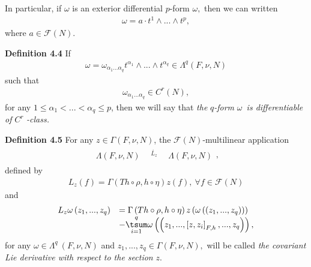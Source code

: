 \documentclass[11pt]{article}
\begin{document}
In particular, if $\omega $ is an exterior differential $p$-form $\omega ,$
then we can written
\begin{equation*}
\begin{array}{c}
\omega =a\cdot t^{1}\wedge ...\wedge t^{p},%
\end{array}%
\end{equation*}%
where $a\in \mathcal{F}\left( N\right) .$

\textbf{Definition 4.4 }If
\begin{equation*}
\begin{array}{c}
\omega =\omega _{\alpha _{1}...\alpha _{q}}t^{\alpha _{1}}\wedge ...\wedge
t^{\alpha _{q}}\in \Lambda ^{q}\left( F,\nu ,N\right)%
\end{array}%
\end{equation*}%
such that
\begin{equation*}
\begin{array}{c}
\omega _{\alpha _{1}...\alpha _{q}}\in C^{r}\left( N\right) ,%
\end{array}%
\end{equation*}%
for any $1\leq \alpha _{1}<...<\alpha _{q}\leq p$, then we will say that
\emph{the }$q$\emph{-form }$\omega $\emph{\ is differentiable of }$C^{r}$%
\emph{-class.}

\textbf{Definition 4.5 }For any $z\in \Gamma \left( F,\nu ,N\right) $, the $%
\mathcal{F}\left( N\right) $-multilinear application
\begin{equation*}
\begin{array}{c}
\begin{array}{rcl}
\Lambda \left( F,\nu ,N\right) & ^{\underrightarrow{~\ \ L_{z}~\ \ }} &
\Lambda \left( F,\nu ,N\right)%
\end{array}%
,%
\end{array}%
\end{equation*}%
defined by%
\begin{equation*}
\begin{array}{c}
L_{z}\left( f\right) =\Gamma \left( Th\circ \rho ,h\circ \eta \right)
z\left( f\right) ,~\forall f\in \mathcal{F}\left( N\right)%
\end{array}%
\end{equation*}%
and
\begin{equation*}
\begin{array}{cl}
L_{z}\omega \left( z_{1},...,z_{q}\right) & =\Gamma \left( Th\circ \rho
,h\circ \eta \right) z\left( \omega \left( \left( z_{1},...,z_{q}\right)
\right) \right) \\
& -\overset{q}{\underset{i=1}{\tsum }}\omega \left( \left( z_{1},...,\left[
z,z_{i}\right] _{F,h},...,z_{q}\right) \right) ,%
\end{array}%
\end{equation*}%
for any $\omega \in \Lambda ^{q}\mathbf{\ }\left( F,\nu ,N\right) $ and $%
z_{1},...,z_{q}\in \Gamma \left( F,\nu ,N\right) ,$ will be called \emph{the
covariant Lie derivative with respect to the section }$z.$
\end{document}
